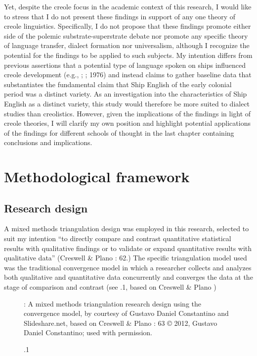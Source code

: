 Yet, despite the creole focus in the academic context of this research, I would like to stress that I do not present these findings in support of any one theory of creole linguistics. Specifically, I do not propose that these findings promote either side of the polemic substrate-superstrate debate nor promote any specific theory of language transfer, dialect formation nor universalism, although I recognize the potential for the findings to be applied to such subjects. My intention differs from previous assertions that a potential type of language spoken on ships influenced creole development (e.g., \citealt{Reinecke1938}; \citealt{Hancock1972}; 1976) and instead claims to gather baseline data that substantiates the fundamental claim that Ship English of the early colonial period was a distinct variety. As an investigation into the characteristics of Ship English as a distinct variety, this study would therefore be more suited to dialect studies than creolistics. However, given the implications of the findings in light of creole theories, I will clarify my own position and highlight potential applications of the findings for different schools of thought in the last chapter containing conclusions and implications. 



\section{{Methodological} {framework}}%



\subsection{{Research} {design}}%



A mixed methods triangulation design was employed in this research, selected to suit my intention “to directly compare and contrast quantitative statistical results with qualitative findings or to validate or expand quantitative results with qualitative data” (Creswell \& Plano \citealt{Clark2007}: 62.) The specific triangulation model used was the traditional convergence model in which a researcher collects and analyzes both qualitative and quantitative data concurrently and converges the data at the stage of comparison and contrast (see .1, based on Creswell \& Plano \citealt{Clark2007})


\begin{figure}
 

\caption{\label{fig:key:1}.1}: A mixed methods triangulation research design using the convergence model, by courtesy of Gustavo Daniel Constantino and Slideshare.net, based on Creswell \& Plano \citealt{Clark2007}: 63 © 2012, Gustavo Daniel Constantino; used with permission. 
\end{figure}



